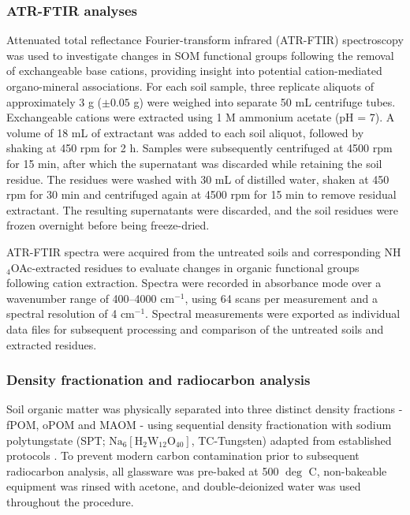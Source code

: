 \documentclass[preprint,12pt]{elsarticle}
\begin{document}
\subsubsection{ATR-FTIR analyses}

Attenuated total reflectance Fourier-transform infrared (ATR-FTIR) spectroscopy was used to investigate changes in SOM functional groups following the removal of exchangeable base cations, providing insight into potential cation-mediated organo-mineral associations. For each soil sample, three replicate aliquots of approximately 3 g ($\pm 0.05$ g) were weighed into separate 50 mL centrifuge tubes. Exchangeable cations were extracted using 1 M ammonium acetate (pH = 7). A volume of 18 mL of extractant was added to each soil aliquot, followed by shaking at 450 rpm for 2 h. Samples were subsequently centrifuged at 4500 rpm for 15 min, after which the supernatant was discarded while retaining the soil residue. The residues were washed with 30 mL of distilled water, shaken at 450 rpm for 30 min and centrifuged again at 4500 rpm for 15 min to remove residual extractant. The resulting supernatants were discarded, and the soil residues were frozen overnight before being freeze-dried.

ATR-FTIR spectra were acquired from the untreated soils and corresponding NH$_4$OAc-extracted residues to evaluate changes in organic functional groups following cation extraction. Spectra were recorded in absorbance mode over a wavenumber range of 400--4000 cm$^{-1}$, using 64 scans per measurement and a spectral resolution of 4 cm$^{-1}$. Spectral measurements were exported as individual data files for subsequent processing and comparison of the untreated soils and extracted residues.  

\subsubsection{Density fractionation and radiocarbon analysis}
Soil organic matter was physically separated into three distinct density fractions - fPOM, oPOM and MAOM - using sequential density fractionation with sodium polytungstate (SPT; $\text{Na}_6[\text{H}_2\text{W}_{12}\text{O}_{40}]$, TC-Tungsten) adapted from established protocols \citep{Gaudinski2000, Crow2007}. To prevent modern carbon contamination prior to subsequent radiocarbon analysis, all glassware was pre-baked at 500 $\deg$ C, non-bakeable equipment was rinsed with acetone, and double-deionized water was used throughout the procedure.
\end{document}
